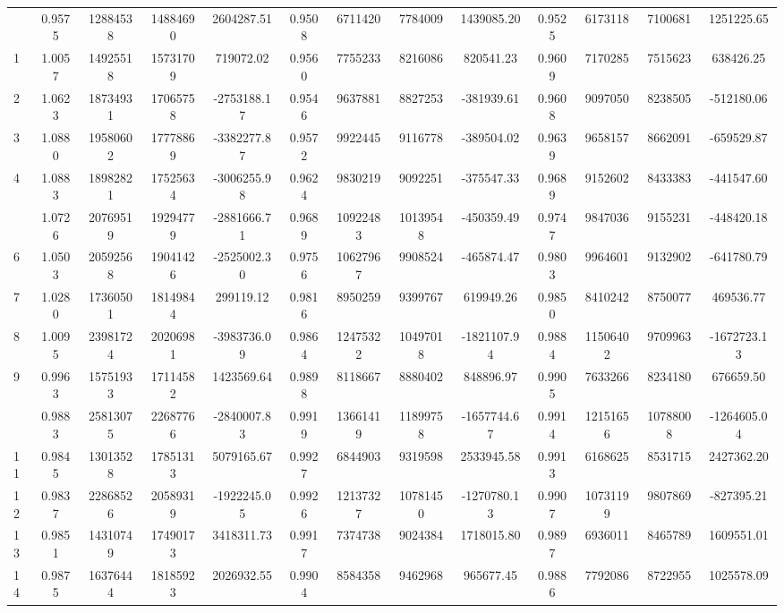 \documentclass[
  12pt,
]{article}
\begin{document}
\begin{longtable}[t]{lcccccccccccc}
\endfoot
\bottomrule
\endlastfoot
0 & 0.9575 & 12884538 & 14884690 & 2604287.51 & 0.9508 & 6711420 & 7784009 & 1439085.20 & 0.9525 & 6173118 & 7100681 & 1251225.65\\
1 & 1.0057 & 14925518 & 15731709 & 719072.02 & 0.9560 & 7755233 & 8216086 & 820541.23 & 0.9609 & 7170285 & 7515623 & 638426.25\\
2 & 1.0623 & 18734931 & 17065758 & -2753188.17 & 0.9546 & 9637881 & 8827253 & -381939.61 & 0.9608 & 9097050 & 8238505 & -512180.06\\
3 & 1.0880 & 19580602 & 17778869 & -3382277.87 & 0.9572 & 9922445 & 9116778 & -389504.02 & 0.9639 & 9658157 & 8662091 & -659529.87\\
4 & 1.0883 & 18982821 & 17525634 & -3006255.98 & 0.9624 & 9830219 & 9092251 & -375547.33 & 0.9689 & 9152602 & 8433383 & -441547.60\\
\addlinespace
5 & 1.0726 & 20769519 & 19294779 & -2881666.71 & 0.9689 & 10922483 & 10139548 & -450359.49 & 0.9747 & 9847036 & 9155231 & -448420.18\\
6 & 1.0503 & 20592568 & 19041426 & -2525002.30 & 0.9756 & 10627967 & 9908524 & -465874.47 & 0.9803 & 9964601 & 9132902 & -641780.79\\
7 & 1.0280 & 17360501 & 18149844 & 299119.12 & 0.9816 & 8950259 & 9399767 & 619949.26 & 0.9850 & 8410242 & 8750077 & 469536.77\\
8 & 1.0095 & 23981724 & 20206981 & -3983736.09 & 0.9864 & 12475322 & 10497018 & -1821107.94 & 0.9884 & 11506402 & 9709963 & -1672723.13\\
9 & 0.9963 & 15751933 & 17114582 & 1423569.64 & 0.9898 & 8118667 & 8880402 & 848896.97 & 0.9905 & 7633266 & 8234180 & 676659.50\\
\addlinespace
10 & 0.9883 & 25813075 & 22687766 & -2840007.83 & 0.9919 & 13661419 & 11899758 & -1657744.67 & 0.9914 & 12151656 & 10788008 & -1264605.04\\
11 & 0.9845 & 13013528 & 17851313 & 5079165.67 & 0.9927 & 6844903 & 9319598 & 2533945.58 & 0.9913 & 6168625 & 8531715 & 2427362.20\\
12 & 0.9837 & 22868526 & 20589319 & -1922245.05 & 0.9926 & 12137327 & 10781450 & -1270780.13 & 0.9907 & 10731199 & 9807869 & -827395.21\\
13 & 0.9851 & 14310749 & 17490173 & 3418311.73 & 0.9917 & 7374738 & 9024384 & 1718015.80 & 0.9897 & 6936011 & 8465789 & 1609551.01\\
14 & 0.9875 & 16376444 & 18185923 & 2026932.55 & 0.9904 & 8584358 & 9462968 & 965677.45 & 0.9886 & 7792086 & 8722955 & 1025578.09\\

\end{longtable}
\end{document}
